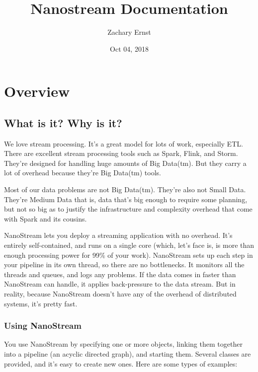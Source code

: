 \documentclass[letterpaper,10pt,english]{sphinxmanual}
\title{Nanostream Documentation}
\date{Oct 04, 2018}
\author{Zachary Ernst}
\begin{document}
\pagestyle{empty}
\maketitle
\pagestyle{plain}
\sphinxtableofcontents
\pagestyle{normal}
\label{\detokenize{index::doc}}



\chapter{Overview}
\label{\detokenize{overview:overview}}\label{\detokenize{overview::doc}}

\section{What is it? Why is it?}
\label{\detokenize{overview:what-is-it-why-is-it}}

We love stream processing. It’s a great model for lots of work,
especially ETL. There are excellent stream processing tools such as
Spark, Flink, and Storm. They’re designed for handling huge amounts of
Big Data(tm). But they carry a lot of overhead because they’re Big
Data(tm) tools.

Most of our data problems are not Big Data(tm). They’re also not Small
Data. They’re Medium Data \textendash{} that is, data that’s big enough to require
some planning, but not so big as to justify the infrastructure and
complexity overhead that come with Spark and its cousins.

NanoStream lets you deploy a streaming application with no overhead.
It’s entirely self-contained, and runs on a single core (which, let’s
face is, is more than enough processing power for 99\% of your work).
NanoStream sets up each step in your pipeline in its own thread, so
there are no bottlenecks. It monitors all the threads and queues, and
logs any problems. If the data comes in faster than NanoStream can
handle, it applies back-pressure to the data stream. But in reality,
because NanoStream doesn’t have any of the overhead of distributed
systems, it’s pretty fast.


\subsection{Using NanoStream}
\label{\detokenize{overview:using-nanostream}}
You use NanoStream by specifying one or more  objects,
linking them together into a pipeline (an acyclic directed graph), and
starting them. Several  classes are provided, and it’s easy
to create new ones. Here are some types of examples:
\end{document}

